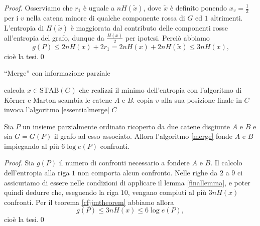\begin{proof}
	Osserviamo che \(r_1\) \`e uguale a \(nH(\tilde{x})\), dove \(\tilde{x}\) \`e definito ponendo \(x_v=\frac{1}{2}\) per i \(v\) nella catena minore di qualche componente rossa di \(G\) ed \(1\) altrimenti. L'entropia di \(H(\tilde{x})\) \`e maggiorata dal contributo delle componenti rosse all'entropia del grafo, dunque da \(\frac{H(x)}{2}\) per ipotesi. Perci\`o abbiamo
	\[ g(P)\le 2nH(x) + 2r_1 = 2nH(x) + 2nH(\tilde{x}) \le 3nH(x)\text{,} \]
	cio\`e la tesi.\qed 
\end{proof}
\begin{algorithm}
	\caption{``Merge'' con informazione parziale} \label{merge} 
	\begin{algorithmic}
		[1] \STATE calcola \(x\in\text{STAB}(G)\) che realizzi il minimo dell'entropia con l'algoritmo di K\"orner e Marton  \STATE scambia le catene \(A\) e \(B\). \ENDIF {}  \STATE copia \(v\) alla sua posizione finale in \(C\) \ENDIF \ENDFOR \STATE invoca l'algoritmo \ref{essentialmerge} \RETURN \(C\) 
	\end{algorithmic}
\end{algorithm}
\begin{theorem}
	\label{mergetheorem} Sia \(P\) un insieme parzialmente ordinato ricoperto da due catene disgiunte \(A\) e \(B\) e sia \(G=\overline{G}(P)\) il grafo ad esso associato. Allora l'algoritmo \ref{merge} fonde \(A\) e \(B\) impiegando al più \(6\log{e(P)}\) confronti. 
\end{theorem}
\begin{proof}
	Sia \(g(P)\) il numero di confronti necessario a fondere \(A\) e \(B\). Il calcolo dell'entropia alla riga \(1\) non comporta alcun confronto. Nelle righe da \(2\) a \(9\) ci assicuriamo di essere nelle condizioni di applicare il lemma \ref{finallemma}, e poter quindi dedurre che, eseguendo la riga \(10\), vengano compiuti al pi\`u \(3nH(x)\) confronti. Per il teorema \ref{cfjjmtheorem} abbiamo allora
	\[g(P)\le 3nH(x)\le 6\log{e(P)},\]
	cio\`e la tesi.\qed 
\end{proof}


